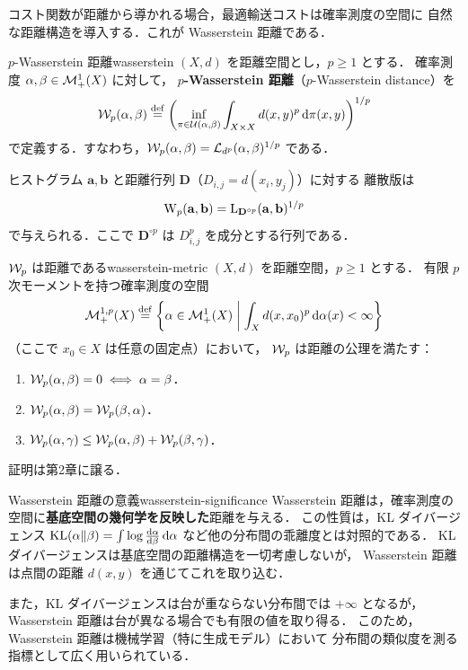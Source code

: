 コスト関数が距離から導かれる場合，最適輸送コストは確率測度の空間に
自然な距離構造を導入する．これが Wasserstein 距離である．

\begin{definition}{$p$-Wasserstein 距離}{wasserstein}
  $(X, d)$ を距離空間とし，$p \geq 1$ とする．
  確率測度 $\alpha, \beta \in \mathcal{M}_+^1(X)$ に対して，
  \textbf{$p$-Wasserstein 距離}（$p$-Wasserstein distance）を
  \[
    \mathcal{W}_p(\alpha, \beta) \overset{\mathrm{def}}{=}
    \left(
    \inf_{\pi \in \mathcal{U}(\alpha, \beta)}
    \int_{X \times X} d(x, y)^p \, \mathrm{d}\pi(x, y)
    \right)^{1/p}
  \]
  で定義する．すなわち，$\mathcal{W}_p(\alpha, \beta) = \mathcal{L}_{d^p}(\alpha, \beta)^{1/p}$ である．

  ヒストグラム $\mathbf{a}, \mathbf{b}$ と距離行列 $\mathbf{D}$（$D_{i,j} = d(x_i, y_j)$）に対する
  離散版は
  \[
    \mathrm{W}_p(\mathbf{a}, \mathbf{b})
    = \mathrm{L}_{\mathbf{D}^{\circ p}}(\mathbf{a}, \mathbf{b})^{1/p}
  \]
  で与えられる．ここで $\mathbf{D}^{\circ p}$ は $D_{i,j}^p$ を成分とする行列である．
\end{definition}

\begin{proposition}{$\mathcal{W}_p$ は距離である}{wasserstein-metric}
  $(X, d)$ を距離空間，$p \geq 1$ とする．
  有限 $p$ 次モーメントを持つ確率測度の空間
  \[
    \mathcal{M}_+^{1,p}(X) \overset{\mathrm{def}}{=}
    \left\{ \alpha \in \mathcal{M}_+^1(X) \;\middle|\;
    \int_X d(x, x_0)^p \, \mathrm{d}\alpha(x) < \infty \right\}
  \]
  （ここで $x_0 \in X$ は任意の固定点）において，
  $\mathcal{W}_p$ は距離の公理を満たす：
  \begin{enumerate}
    \item $\mathcal{W}_p(\alpha, \beta) = 0 \iff \alpha = \beta$．
    \item $\mathcal{W}_p(\alpha, \beta) = \mathcal{W}_p(\beta, \alpha)$．
    \item $\mathcal{W}_p(\alpha, \gamma) \leq \mathcal{W}_p(\alpha, \beta) + \mathcal{W}_p(\beta, \gamma)$．
  \end{enumerate}
  証明は第2章に譲る．
\end{proposition}

\begin{remark}{Wasserstein 距離の意義}{wasserstein-significance}
  Wasserstein 距離は，確率測度の空間に\textbf{基底空間の幾何学を反映した}距離を与える．
  この性質は，KL ダイバージェンス
  $\operatorname{KL}(\alpha \| \beta) = \int \log\frac{\mathrm{d}\alpha}{\mathrm{d}\beta} \, \mathrm{d}\alpha$
  など他の分布間の乖離度とは対照的である．
  KL ダイバージェンスは基底空間の距離構造を一切考慮しないが，
  Wasserstein 距離は点間の距離 $d(x, y)$ を通じてこれを取り込む．

  また，KL ダイバージェンスは台が重ならない分布間では $+\infty$ となるが，
  Wasserstein 距離は台が異なる場合でも有限の値を取り得る．
  このため，Wasserstein 距離は機械学習（特に生成モデル）において
  分布間の類似度を測る指標として広く用いられている．
\end{remark}

